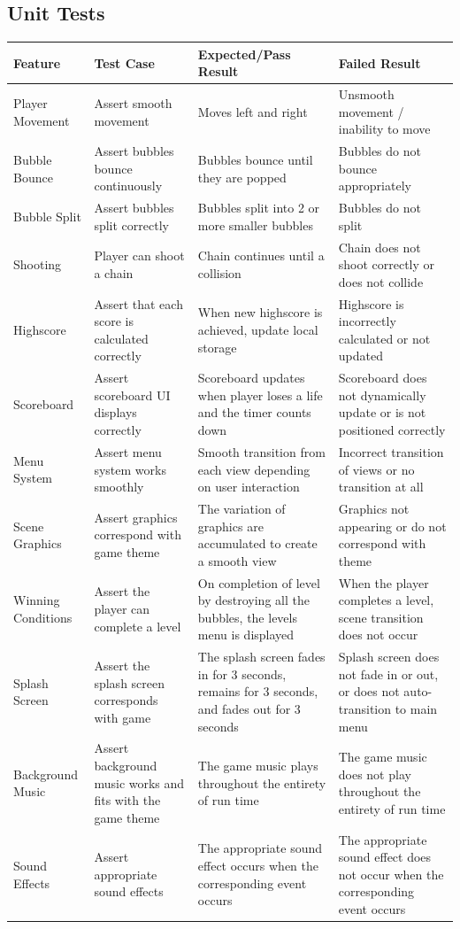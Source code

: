 \documentclass{article}
\begin{document}
\subsection{Unit Tests}
\begin{center}
\begin{tabular}{ | m{5em} | m{4cm}| m{4cm} |  m{4cm} |} 
  \hline
  Feature & Test Case & Expected/Pass Result & Failed Result \\ 
  \hline
  Player Movement & Assert smooth movement & Moves left and right & Unsmooth movement / inability to move \\ 
  \hline
  Bubble Bounce & Assert bubbles bounce continuously & Bubbles bounce until they are popped & Bubbles do not bounce appropriately \\ 
  \hline
  Bubble Split & Assert bubbles split correctly & Bubbles split into 2 or more smaller bubbles & Bubbles do not split \\ 
  \hline
  Shooting & Player can shoot a chain & Chain continues until a collision & Chain does not shoot correctly or does not collide \\ 
  \hline
  Highscore & Assert that each score is calculated correctly & When new highscore is achieved, update local storage & Highscore is incorrectly calculated or not updated \\ 
  \hline
  Scoreboard & Assert scoreboard UI displays correctly & Scoreboard updates when player loses a life and the timer counts down & Scoreboard does not dynamically update or is not positioned correctly \\ 
  \hline
  Menu System & Assert menu system works smoothly & Smooth transition from each view depending on user interaction & Incorrect transition of views or no transition at all \\ 
  \hline
  Scene Graphics & Assert graphics correspond with game theme & The variation of graphics are accumulated to create a smooth view & Graphics not appearing or do not correspond with theme \\ 
  \hline
  Winning Conditions & Assert the player can complete a level & On completion of level by destroying all the bubbles, the levels menu is displayed & When the player completes a level, scene transition does not occur \\ 
  \hline
  Splash Screen & Assert the splash screen corresponds with game & The splash screen fades in for 3 seconds, remains for 3 seconds, and fades out for 3 seconds & Splash screen does not fade in or out, or does not auto-transition to main menu \\ 
  \hline
  Background Music & Assert background music works and fits with the game theme & The game music plays throughout the entirety of run time & The game music does not play throughout the entirety of run time \\ 
  \hline
  Sound Effects & Assert appropriate sound effects & The appropriate sound effect occurs when the corresponding event occurs & The appropriate sound effect does not occur when the corresponding event occurs \\ 
  \hline
\end{tabular}
\end{center}
\end{document}
